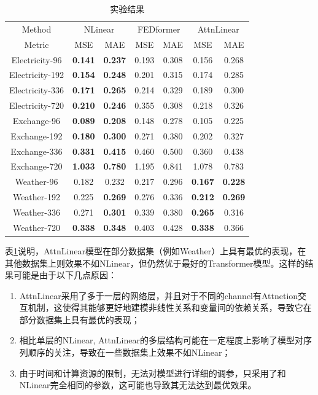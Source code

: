 \documentclass{article}
\begin{document}
\begin{table}
\label{tb:result}
\caption{实验结果}
\centering
\begin{tabular}{ccccccc}
    \toprule
    Method & \multicolumn{2}{c}{NLinear} & \multicolumn{2}{c}{FEDformer} & \multicolumn{2}{c}{AttnLinear} \\
    Metric & MSE & MAE & MSE & MAE & MSE & MAE \\
    \midrule
    Electricity-96  & \textbf{0.141} & \textbf{0.237} & 0.193 & 0.308 & 0.156 & 0.268 \\
    Electricity-192 & \textbf{0.154} & \textbf{0.248} & 0.201 & 0.315 & 0.174 & 0.285 \\
    Electricity-336 & \textbf{0.171} & \textbf{0.265} & 0.214 & 0.329 & 0.189 & 0.300 \\
    Electricity-720 & \textbf{0.210} & \textbf{0.246} & 0.355 & 0.308 & 0.218 & 0.326 \\
    Exchange-96     & \textbf{0.089} & \textbf{0.208} & 0.148 & 0.278 & 0.105 & 0.225 \\
    Exchange-192    & \textbf{0.180} & \textbf{0.300} & 0.271 & 0.380 & 0.202 & 0.327 \\
    Exchange-336    & \textbf{0.331} & \textbf{0.415} & 0.460 & 0.500 & 0.360 & 0.438 \\
    Exchange-720    & \textbf{1.033} & \textbf{0.780} & 1.195 & 0.841 & 1.078 & 0.783 \\
    Weather-96      & 0.182 & 0.232 & 0.217 & 0.296 & \textbf{0.167} & \textbf{0.228} \\
    Weather-192     & 0.225 & \textbf{0.269} & 0.276 & 0.336 & \textbf{0.212} & \textbf{0.269} \\
    Weather-336     & 0.271 & \textbf{0.301} & 0.339 & 0.380 & \textbf{0.265} & 0.316 \\
    Weather-720     & \textbf{0.338} & \textbf{0.348} & 0.403 & 0.428 & \textbf{0.338} & 0.366 \\
    \bottomrule
\end{tabular}
\end{table}



表\ref{tb:result}说明，AttnLinear模型在部分数据集（例如Weather）上具有最优的表现，在其他数据集上则效果不如NLinear，但仍然优于最好的Transformer模型。这样的结果可能是由于以下几点原因：
\begin{enumerate}
    \item AttnLinear采用了多于一层的网络层，并且对于不同的channel有Attnetion交互机制，这使得其能够更好地建模非线性关系和变量间的依赖关系，导致它在部分数据集上具有最优的表现；
    \item 相比单层的NLinear, AttnLinear的多层结构可能在一定程度上影响了模型对序列顺序的关注，导致在一些数据集上效果不如NLinear；
    \item 由于时间和计算资源的限制，无法对模型进行详细的调参，只采用了和NLinear完全相同的参数，这可能也导致其无法达到最优效果。
\end{enumerate}
\end{document}
